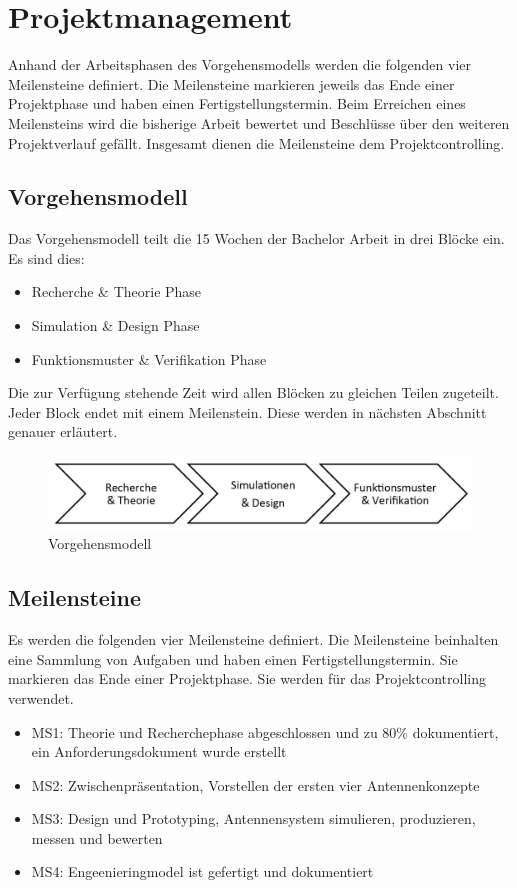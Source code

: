 \newpage
\chapter{Projektmanagement}
Anhand der Arbeitsphasen des Vorgehensmodells werden die folgenden vier Meilensteine definiert. Die Meilensteine markieren jeweils das Ende einer Projektphase und haben einen Fertigstellungstermin. Beim Erreichen eines Meilensteins wird die bisherige Arbeit bewertet und Beschlüsse über den weiteren Projektverlauf gefällt. Insgesamt dienen die Meilensteine dem Projektcontrolling.
\section{Vorgehensmodell}
Das Vorgehensmodell teilt die 15 Wochen der Bachelor Arbeit in drei Blöcke ein. Es sind dies:
\begin{itemize}
\item Recherche \& Theorie Phase
\item Simulation \& Design Phase
\item Funktionsmuster \& Verifikation Phase
\end{itemize}
Die zur Verfügung stehende Zeit wird allen Blöcken zu gleichen Teilen zugeteilt. Jeder Block endet mit einem Meilenstein. Diese werden in nächsten Abschnitt genauer erläutert.
\begin{figure}[!ht]
	\begin{center}
		\includegraphics[width=16cm]{content/bilder/Vorgehensmodell.pdf}%
	\end{center}
	\caption{Vorgehensmodell}
	\label{Vorgehensmodell}
\end{figure}
\section{Meilensteine}
Es werden die folgenden vier Meilensteine definiert. Die Meilensteine
beinhalten   eine Sammlung von Aufgaben und haben einen
Fertigstellungstermin. Sie markieren das Ende einer Projektphase. Sie
werden für das Projektcontrolling verwendet. 
	\begin{itemize}
		\item MS1: Theorie und Recherchephase abgeschlossen und zu 80\% dokumentiert, ein Anforderungsdokument wurde erstellt
		\item MS2: Zwischenpräsentation, Vorstellen der ersten vier Antennenkonzepte
		\item MS3: Design und Prototyping, Antennensystem simulieren, produzieren, messen und bewerten
		\item MS4: Engeenieringmodel ist gefertigt und dokumentiert
	\end{itemize}




